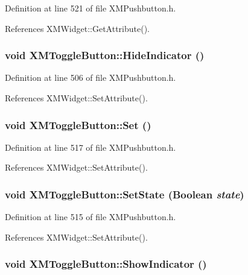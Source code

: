 Definition at line 521 of file XMPushbutton.h.

References XMWidget::Get\-Attribute().
\subsubsection{\setlength{\rightskip}{0pt plus 5cm}void XMToggle\-Button::Hide\-Indicator ()\hspace{0.3cm}{\tt  [inline]}}\label{classXMToggleButton_a5}




Definition at line 506 of file XMPushbutton.h.

References XMWidget::Set\-Attribute().
\subsubsection{\setlength{\rightskip}{0pt plus 5cm}void XMToggle\-Button::Set ()\hspace{0.3cm}{\tt  [inline]}}\label{classXMToggleButton_a9}




Definition at line 517 of file XMPushbutton.h.

References XMWidget::Set\-Attribute().
\subsubsection{\setlength{\rightskip}{0pt plus 5cm}void XMToggle\-Button::Set\-State (Boolean {\em state})\hspace{0.3cm}{\tt  [inline]}}\label{classXMToggleButton_a8}




Definition at line 515 of file XMPushbutton.h.

References XMWidget::Set\-Attribute().
\subsubsection{\setlength{\rightskip}{0pt plus 5cm}void XMToggle\-Button::Show\-Indicator ()\hspace{0.3cm}{\tt  [inline]}}\label{classXMToggleButton_a4}




